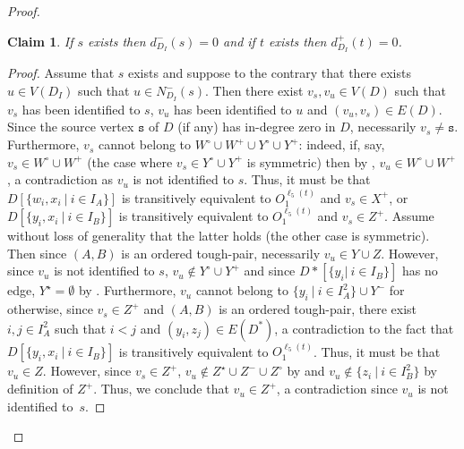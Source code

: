 \documentclass[a4paper,11pt]{article}
\theoremstyle{plain}
\newtheorem{claim}[theorem]{Claim}
\newtheorem{identification rule}{Identification Rule}
\theoremstyle{definition}
\theoremstyle{remark}
\newenvironment{claimproof}{\begin{proof}\renewcommand{\qedsymbol}{\claimqed}}{\end{proof}\renewcommand{\qedsymbol}{\plainqed}}
\let\plainqed\qedsymbol
\newcommand{\claimqed}{$\lrcorner$}
\newcommand{\toughpair}{tough-pair}
\newcommand{\sss}{\texttt{s}}
\begin{document}
\begin{proof}
\begin{claim}
\label{clm:sourcesink}
If $s$ exists then $d^-_{D_I}(s) = 0$ and if $t$ exists then $d^+_{D_I}(t) = 0$.
\end{claim}

\begin{claimproof}
Assume that $s$ exists and suppose to the contrary that there exists $u \in V(D_I)$ such that $u \in N^-_{D_I}(s)$.
Then there exist $v_s,v_u \in V(D)$ such that $v_s$ has been identified to $s$, $v_u$ has been identified to $u$ and $(v_u,v_s) \in E(D)$. 
Since the source vertex $\sss$ of $D$ (if any) has in-degree zero in $D$, necessarily $v_s \neq \sss$.
Furthermore, $v_s$ cannot belong to $W^\circ \cup W^+ \cup Y^\circ \cup Y^+$: indeed, if, say, $v_s \in W^\circ \cup W^+$ (the case where $v_s \in Y^\circ \cup Y^+$ is symmetric) then by , $v_u \in W^\circ \cup W^+$, a contradiction as $v_u$ is not identified to $s$.
Thus, it must be that $D[\{w_i,x_i~|~i \in I_A\}]$ is transitively equivalent to $O_1^{\ell_5(t)}$ and $v_s \in X^+$,
or $D[\{y_i,x_i~|~i \in I_B\}]$ is transitively equivalent to $O_1^{\ell_5(t)}$ and $v_s \in Z^+$.
Assume without loss of generality that the latter holds (the other case is symmetric).
Then since $(A,B)$ is an ordered \toughpair, necessarily $v_u \in Y \cup Z$.
However, since $v_u$ is not identified to $s$, $v_u \notin Y^\circ \cup Y^+$ 
and since $D*[\{y_i|~i \in I_B\}]$ has no edge, $Y^\star = \emptyset$ by .
Furthermore, $v_u$ cannot belong to $\{y_i~|~i \in I_A^2\} \cup Y^-$ for otherwise, since $v_s \in Z^+$ and $(A,B)$ is an ordered \toughpair, there exist $i,j \in I_A^2$ such that $i < j$ and $(y_i,z_j) \in E(D^*)$, a contradiction to the fact that $D[\{y_i,x_i~|~i \in I_B\}]$ is transitively equivalent to $O_1^{\ell_5(t)}$.
Thus, it must be that $v_u \in Z$.
However, since $v_s \in Z^+$, $v_u \notin Z^\star \cup Z^- \cup Z^\circ$ by 
and $v_u \notin \{z_i~|~i \in I_B^2\}$ by definition of $Z^+$. 
Thus, we conclude that $v_u \in Z^+$, a contradiction since $v_u$ is not identified to~$s$.


\end{claimproof}
\end{proof}
\end{document}
